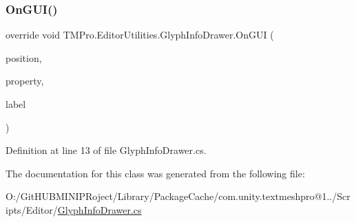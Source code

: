 \subsubsection{\texorpdfstring{OnGUI()}{OnGUI()}}
{\footnotesize\ttfamily override void T\+M\+Pro.\+Editor\+Utilities.\+Glyph\+Info\+Drawer.\+On\+G\+UI (\begin{DoxyParamCaption}\item[{Rect}]{position,  }\item[{Serialized\+Property}]{property,  }\item[{G\+U\+I\+Content}]{label }\end{DoxyParamCaption})}



Definition at line 13 of file Glyph\+Info\+Drawer.\+cs.



The documentation for this class was generated from the following file\+:\begin{DoxyCompactItemize}
\item 
O\+:/\+Git\+H\+U\+B\+M\+I\+N\+I\+P\+Roject/\+Library/\+Package\+Cache/com.\+unity.\+textmeshpro@1../\+Scripts/\+Editor/\mbox{\hyperlink{_glyph_info_drawer_8cs}{Glyph\+Info\+Drawer.\+cs}}\end{DoxyCompactItemize}
